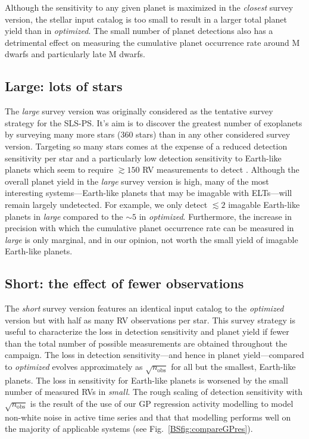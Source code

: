 Although the sensitivity to any given planet is maximized in the \emph{closest} survey version, the stellar
input catalog is too small to result in a larger total planet yield than in \emph{optimized}. The small number
of planet detections also has a detrimental effect on measuring the cumulative planet occurrence rate
around M dwarfs and particularly late M dwarfs.

\subsection{Large: lots of stars}
The \emph{large} survey version was originally considered as the tentative survey strategy for the SLS-PS.
It's aim is to discover the greatest number of exoplanets by surveying many more stars (360 stars) than
in any other considered survey version. Targeting so many stars comes at the expense of a reduced detection
sensitivity per star and a particularly low detection sensitivity to Earth-like planets which seem to require
$\gtrsim 150$ RV measurements to detect \citep[e.g.][]{astudillodefru17a}. Although the
overall planet yield in the \emph{large} survey version is high, many of the most interesting
systems---Earth-like planets that may be imagable with ELTs---will remain largely undetected. For example,
we only detect $\lesssim 2$ imagable Earth-like planets in \emph{large} compared to the $\sim 5$ in
\emph{optimized}. Furthermore, the
increase in precision with which the cumulative planet occurrence rate can be measured in \emph{large} is only
marginal, and in our opinion, not worth the small yield of imagable Earth-like planets.

\subsection{Short: the effect of fewer observations}
The \emph{short} survey version features an identical input catalog to the \emph{optimized} version but
with half as many RV observations per star. This survey strategy is useful to characterize the loss in detection  
sensitivity and planet yield if fewer than the total number of possible measurements are
obtained throughout the campaign. The loss in detection sensitivity---and hence in planet yield---compared to
\emph{optimized} evolves
approximately as $\sqrt{n_{\text{obs}}}$ for all but the smallest, Earth-like planets. The loss in sensitivity
for Earth-like planets is worsened by the small number of measured RVs in \emph{small}. The rough scaling of
detection sensitivity with $\sqrt{n_{\text{obs}}}$ is the result of the use of our GP regression activity modelling
to model non-white noise in active time series and that that modelling performs well on the majority of applicable
systems (see Fig.~\ref{BSfig:compareGPres}).


